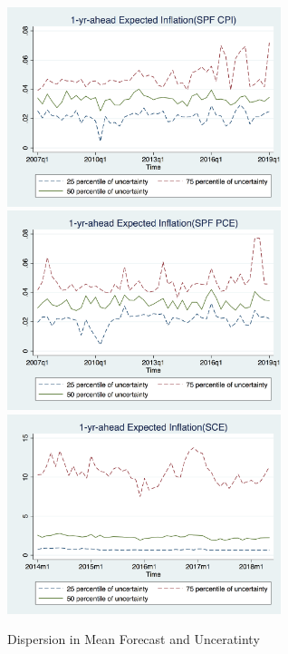 \documentclass[]{article}
\begin{document}
\begin{figure}[ht]
	\centering
	\includegraphics[width=8cm]{figures/IQRvarCPIQ.png} \\
	\smallskip
	\includegraphics[width=8cm]{figures/IQRvarPCEQ.png}\\
		\smallskip
	\includegraphics[width=8cm]{figures/IQRvarSCEM.png}\\
	\caption{Dispersion in Mean Forecast and Unceratinty }
	\label{IQR_Unceratitny}
\end{figure}
\end{document}
